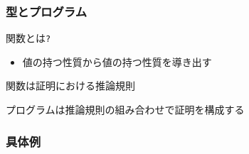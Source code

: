 \documentclass[cjk,dvipdfm,14pt]{beamer}
\begin{document}
\begin{frame}[fragile]
\frametitle{型とプログラム}

関数とは\verb|?|
\begin{itemize}
\item 値の持つ性質から値の持つ性質を導き出す
\end{itemize}

関数は証明における推論規則

{ \color{red} プログラムは推論規則の組み合わせで証明を構成する }

\end{frame}

\begin{frame}[fragile]
\frametitle{具体例}


\end{frame}


\end{document}

